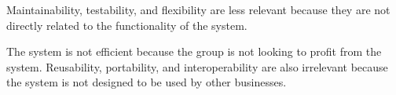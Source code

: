Maintainability, testability, and flexibility are less relevant because they are not directly related to the
functionality of the system.

The system is not efficient because the group is not looking to profit from the system.
Reusability, portability, and interoperability are also irrelevant because the system is not designed to be used by
other businesses.
